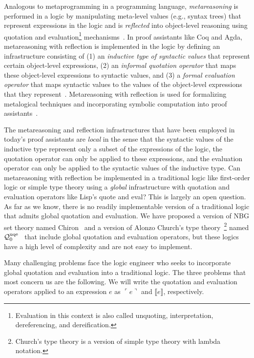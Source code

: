 \documentclass[fleqn]{llncs}
\newcommand{\bsp}{\begin{sloppypar}}
\newcommand{\esp}{\end{sloppypar}}
\newcommand{\qzerouqe}{${\cal Q}^{\rm uqe}_{0}$}
\newcommand{\sembrack}[1]{\llbracket#1\rrbracket}
\newcommand{\synbrack}[1]{\ulcorner#1\urcorner}
\begin{document}
\bsp Analogous to metaprogramming in a programming language,
\emph{metareasoning} is performed in a logic by manipulating
meta-level values (e.g., syntax trees) that represent expressions in
the logic and is \emph{reflected} into object-level reasoning using
quotation and evaluation\footnote{Evaluation in this context is also
  called unquoting, interpretation, dereferencing, and dereification.}
mechanisms~\cite{Costantini02}.  In proof assistants like Coq and
Agda, metareasoning with reflection is implemented in the logic by
defining an infrastructure consisting of (1) an \emph{inductive type
  of syntactic values} that represent certain object-level
expressions, (2) an \emph{informal quotation operator} that maps these
object-level expressions to syntactic values, and (3) a \emph{formal
  evaluation operator} that maps syntactic values to the values of the
object-level expressions that they
represent~\cite{Chlipala13,GonthierEtAl15,VanDerWaltSwierstra12}.
Metareasoning with reflection is used for formalizing metalogical
techniques and incorporating symbolic computation into proof
assistants~\cite{Chlipala13,Farmer13,GonthierEtAl15,Harrison95,VanDerWaltSwierstra12}.
\esp

The metareasoning and reflection infrastructures that have been
employed in today's proof assistants are \emph{local} in the
sense that the syntactic values of the inductive type represent only a
subset of the expressions of the logic, the quotation operator can
only be applied to these expressions, and the evaluation operator can
only be applied to the syntactic values of the inductive type.  Can
metareasoning with reflection be implemented in a traditional logic
like first-order logic or simple type theory using a \emph{global}
infrastructure with quotation and evaluation operators like Lisp's
quote and eval?  This is largely an open question.  As far as we know,
there is no readily implementable version of a traditional logic that
admits global quotation and evaluation.  We have proposed a version of
NBG set theory named Chiron~\cite{FarmerArxiv13} and a version of
Alonzo Church's type theory~\cite{Church40}\footnote{Church's type
  theory is a version of simple type theory with lambda notation.}
named {\qzerouqe}~\cite{FarmerArxiv14} that include global quotation
and evaluation operators, but these logics have a high level of
complexity and are not easy to implement.

Many challenging problems face the logic engineer who seeks to
incorporate global quotation and evaluation into a traditional logic.
The three problems that most concern us are the following.  We will
write the quotation and evaluation operators applied to an expression
$e$ as $\synbrack{e}$ and $\sembrack{e}$, respectively.
\end{document}
